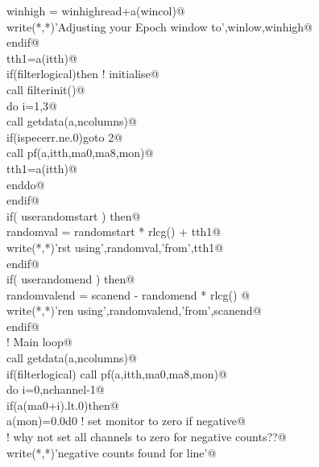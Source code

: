 \documentclass[10pt,a4paper,notitlepage]{article}
\begin{document}
\begin{flushleft}
\begin{list}{}{}
\mbox{}\verb@         winhigh = winhighread+a(wincol)@\\
\mbox{}\verb@         write(*,*)'Adjusting your Epoch window to',winlow,winhigh@\\
\mbox{}\verb@      endif@\\
\mbox{}\verb@      tth1=a(itth)@\\
\mbox{}\verb@      if(filterlogical)then  ! initialise@\\
\mbox{}\verb@        call filterinit()@\\
\mbox{}\verb@        do i=1,3@\\
\mbox{}\verb@          call getdata(a,ncolumns)@\\
\mbox{}\verb@          if(ispecerr.ne.0)goto 2@\\
\mbox{}\verb@          call pf(a,itth,ma0,ma8,mon)@\\
\mbox{}\verb@          tth1=a(itth)@\\
\mbox{}\verb@        enddo@\\
\mbox{}\verb@      endif@\\
\mbox{}\verb@      if( userandomstart ) then@\\
\mbox{}\verb@        randomval = randomstart * rlcg() + tth1@\\
\mbox{}\verb@        write(*,*)'rst using',randomval,'from',tth1@\\
\mbox{}\verb@      endif@\\
\mbox{}\verb@      if( userandomend ) then@\\
\mbox{}\verb@        randomvalend = scanend - randomend * rlcg() @\\
\mbox{}\verb@        write(*,*)'ren using',randomvalend,'from',scanend@\\
\mbox{}\verb@      endif@\\
\mbox{}\verb@! Main loop@\\
\mbox{}     call getdata(a,ncolumns)@\\
\mbox{}\verb@      if(filterlogical) call pf(a,itth,ma0,ma8,mon)@\\
\mbox{}\verb@      do i=0,nchannel-1@\\
\mbox{}\verb@        if(a(ma0+i).lt.0)then@\\
\mbox{}\verb@         a(mon)=0.0d0 ! set monitor to zero if negative@\\
\mbox{}\verb@! why not set all channels to zero for negative counts??@\\
\mbox{}\verb@         write(*,*)'negative counts found for line'@\\

\end{list}
\end{flushleft}
\end{document}
